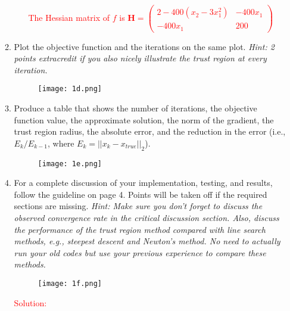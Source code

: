 \documentclass[11pt]{article}
\begin{document}
\begin{enumerate}
\begin{enumerate}
\begin{enumerate}
            \textcolor{red}{The Hessian matrix of $f$ is $\mathbf{H} = \begin{pmatrix} 2 - 400(x_2 - 3x_1^2) & -400x_1 \\ -400x_1 & 200 \end{pmatrix}$}
            
    \end{enumerate}
  
  \item Plot the objective function and the iterations on the same
    plot. {\it Hint: 2 points extracredit if you also nicely
      illustrate the trust region at every iteration.}

    \begin{figure}[H]
    \centering
    \texttt{[image: 1d.png]} 
    \end{figure}
      
  \item Produce a table that shows the number of iterations, the
    objective function value, the approximate solution, the norm of
    the gradient, the trust region radius, the absolute error, and the
    reduction in the error (i.e., $E_{k}/E_{k-1}$, where $E_k = ||x_k -
    x_{true}||_2$).

    \begin{figure}[H]
    \centering
    \texttt{[image: 1e.png]} 
    \end{figure}
    
  \item For a complete discussion of your implementation, testing, and
    results, follow the guideline on page 4. Points will be taken off
    if the required sections are missing. {\it Hint: Make sure you
      don't forget to discuss the observed convergence rate in the
      critical discussion section. Also, discuss the performance of
      the trust region method compared with line search methods, e.g.,
      steepest descent and Newton's method. No need to actually run
      your old codes but use your previous experience to compare these
      methods.}
      
    \begin{figure}[H]
    \centering
    \texttt{[image: 1f.png]} 
    \end{figure}


    
    \item[\textcolor{red}{Solution:}] 


\end{enumerate}
\end{enumerate}
\end{document}
